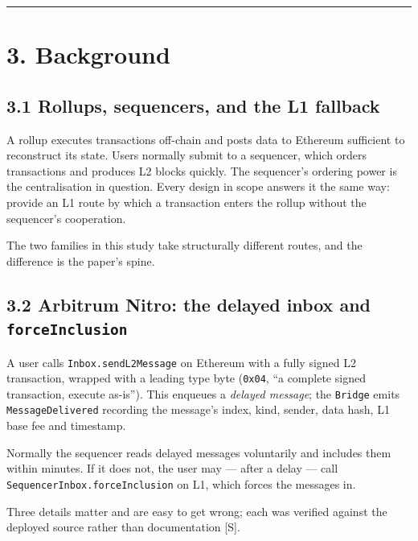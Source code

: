 \documentclass[conference]{IEEEtran}
\renewcommand{\_}{\textunderscore\allowbreak}
\begin{document}
\begin{center}\rule{0.5\linewidth}{0.5pt}\end{center}

\section{3. Background}\label{background}

\subsection{3.1 Rollups, sequencers, and the L1
fallback}\label{rollups-sequencers-and-the-l1-fallback}

A rollup executes transactions off-chain and posts data to Ethereum
sufficient to reconstruct its state. Users normally submit to a
sequencer, which orders transactions and produces L2 blocks quickly. The
sequencer's ordering power is the centralisation in question. Every
design in scope answers it the same way: provide an L1 route by which a
transaction enters the rollup without the sequencer's cooperation.

The two families in this study take structurally different routes, and
the difference is the paper's spine.

\subsection{\texorpdfstring{3.2 Arbitrum Nitro: the delayed inbox and
\texttt{forceInclusion}}{3.2 Arbitrum Nitro: the delayed inbox and forceInclusion}}\label{arbitrum-nitro-the-delayed-inbox-and-forceinclusion}

A user calls \texttt{Inbox.sendL2Message} on Ethereum with a fully
signed L2 transaction, wrapped with a leading type byte (\texttt{0x04},
``a complete signed transaction, execute as-is''). This enqueues a
\emph{delayed message}; the \texttt{Bridge} emits
\texttt{MessageDelivered} recording the message's index, kind, sender,
data hash, L1 base fee and timestamp.

Normally the sequencer reads delayed messages voluntarily and includes
them within minutes. If it does not, the user may --- after a delay ---
call \texttt{SequencerInbox.forceInclusion} on L1, which forces the
messages in.

Three details matter and are easy to get wrong; each was verified
against the deployed source rather than documentation {[}S{]}.
\end{document}
